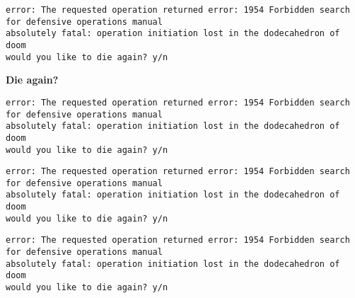 \begin{verbatim}
error: The requested operation returned error: 1954 Forbidden search for defensive operations manual
absolutely fatal: operation initiation lost in the dodecahedron of doom
would you like to die again? y/n
\end{verbatim}

{\bf Die again?}
\begin{verbatim}
error: The requested operation returned error: 1954 Forbidden search for defensive operations manual
absolutely fatal: operation initiation lost in the dodecahedron of doom
would you like to die again? y/n
\end{verbatim}

\begin{verbatim}
error: The requested operation returned error: 1954 Forbidden search for defensive operations manual
absolutely fatal: operation initiation lost in the dodecahedron of doom
would you like to die again? y/n
\end{verbatim}

\begin{verbatim}
error: The requested operation returned error: 1954 Forbidden search for defensive operations manual
absolutely fatal: operation initiation lost in the dodecahedron of doom
would you like to die again? y/n
\end{verbatim}
